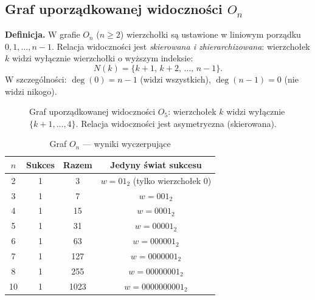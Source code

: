 \documentclass[12pt,a4paper]{article}
\theoremstyle{plain}
\theoremstyle{definition}
\theoremstyle{remark}
\begin{document}
\subsection{Graf uporządkowanej widoczności $O_n$}
\label{sec:ordered}

\textbf{Definicja.} W grafie $O_n$ ($n \ge 2$) wierzchołki są ustawione w liniowym porządku $0, 1, \ldots, n{-}1$. Relacja widoczności jest \emph{skierowana i zhierarchizowana}: wierzchołek $k$ widzi wyłącznie wierzchołki o wyższym indeksie:
$$N(k) = \{k+1,\, k+2,\, \ldots,\, n-1\}.$$
W szczególności: $\deg(0) = n-1$ (widzi wszystkich), $\deg(n-1) = 0$ (nie widzi nikogo).

\begin{figure}[H]
  \centering
  \caption{Graf uporządkowanej widoczności $O_5$: wierzchołek $k$ widzi wyłącznie $\{k{+}1,\ldots,4\}$. Relacja widoczności jest asymetryczna (skierowana).}
  \label{fig:o5}
\end{figure}

\begin{table}[H]
\centering
\caption{Graf $O_n$ — wyniki wyczerpujące}
\begin{tabular}{cccc}
\toprule
$n$ & Sukces & Razem & Jedyny świat sukcesu \\
\midrule
2  & 1 & 3    & $w = 01_2$ (tylko wierzchołek 0) \\
3  & 1 & 7    & $w = 001_2$ \\
4  & 1 & 15   & $w = 0001_2$ \\
5  & 1 & 31   & $w = 00001_2$ \\
6  & 1 & 63   & $w = 000001_2$ \\
7  & 1 & 127  & $w = 0000001_2$ \\
8  & 1 & 255  & $w = 00000001_2$ \\
10 & 1 & 1023 & $w = 0000000001_2$ \\
\bottomrule
\end{tabular}
\end{table}
\end{document}
